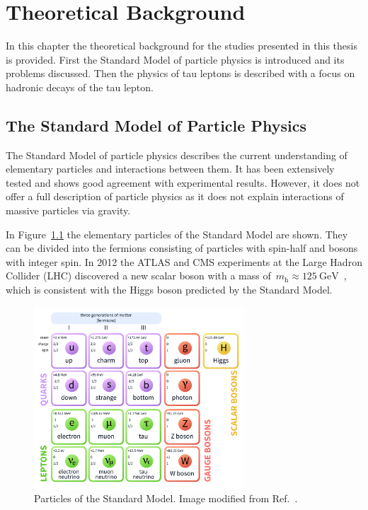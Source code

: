 \chapter{Theoretical Background}
\label{sec:theory}

In this chapter the theoretical background for the studies presented in this
thesis is provided. First the Standard Model of particle physics is introduced
and its problems discussed. Then the physics of tau leptons is described with a
focus on hadronic decays of the tau lepton.

\section{The Standard Model of Particle Physics}

The Standard Model of particle physics describes the current understanding of
elementary particles and interactions between them. It has been extensively
tested and shows good agreement with experimental results. However, it does not
offer a full description of particle physics as it does not explain interactions
of massive particles via gravity.

In Figure~\ref{fig:sm_particles} the elementary particles of the Standard Model
are shown. They can be divided into the fermions consisting of particles with
spin-half and bosons with integer spin. In 2012 the ATLAS and CMS experiments at
the Large Hadron Collider (LHC) discovered a new scalar boson with a mass
of~$m_\text{h} \approx \SI{125}{\GeV}$~\cite{higgs_atlas, higgs_cms}, which is
consistent with the Higgs boson predicted by the Standard Model.

\begin{figure}[htb]
  \centering
  \includegraphics[width=0.7\textwidth]{./figures/theory/sm_particles.pdf}
  \caption[Particles of the Standard Model]{Particles of the Standard Model.
    Image modified from Ref.~\cite{sm_wiki}.}
  \label{fig:sm_particles}
\end{figure}

